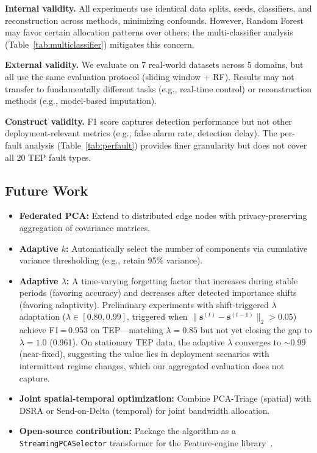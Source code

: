 \documentclass[journal]{IEEEtran}
\begin{document}
\textbf{Internal validity.} All experiments use identical data splits, seeds, classifiers, and reconstruction across methods, minimizing confounds. However, Random Forest may favor certain allocation patterns over others; the multi-classifier analysis (Table~\ref{tab:multiclassifier}) mitigates this concern.

\textbf{External validity.} We evaluate on 7 real-world datasets across 5 domains, but all use the same evaluation protocol (sliding window + RF). Results may not transfer to fundamentally different tasks (e.g., real-time control) or reconstruction methods (e.g., model-based imputation).

\textbf{Construct validity.} F1 score captures detection performance but not other deployment-relevant metrics (e.g., false alarm rate, detection delay). The per-fault analysis (Table~\ref{tab:perfault}) provides finer granularity but does not cover all 20 TEP fault types.

\subsection{Future Work}

\begin{itemize}[leftmargin=*]
\item \textbf{Federated PCA:} Extend to distributed edge nodes with privacy-preserving aggregation of covariance matrices.
\item \textbf{Adaptive $k$:} Automatically select the number of components via cumulative variance thresholding (e.g., retain 95\% variance).
\item \textbf{Adaptive $\lambda$:} A time-varying forgetting factor that increases during stable periods (favoring accuracy) and decreases after detected importance shifts (favoring adaptivity). Preliminary experiments with shift-triggered $\lambda$ adaptation ($\lambda \in [0.80, 0.99]$, triggered when $\|\mathbf{s}^{(t)} - \mathbf{s}^{(t-1)}\|_2 > 0.05$) achieve F1\,=\,0.953 on TEP---matching $\lambda{=}0.85$ but not yet closing the gap to $\lambda{=}1.0$ (0.961). On stationary TEP data, the adaptive $\lambda$ converges to ${\sim}0.99$ (near-fixed), suggesting the value lies in deployment scenarios with intermittent regime changes, which our aggregated evaluation does not capture.
\item \textbf{Joint spatial-temporal optimization:} Combine PCA-Triage (spatial) with DSRA or Send-on-Delta (temporal) for joint bandwidth allocation.
\item \textbf{Open-source contribution:} Package the algorithm as a \texttt{StreamingPCASelector} transformer for the Feature-engine library~\cite{galli2022feature}.
\end{itemize}
\end{document}
